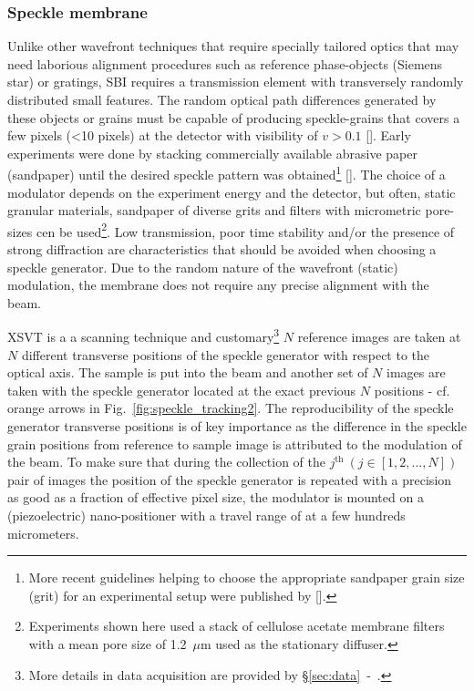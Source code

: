 \begin{refsection}
\subsubsection*{Speckle membrane}

Unlike other wavefront techniques that require specially tailored optics that may need laborious alignment procedures such as reference phase-objects (Siemens star) or gratings, SBI requires a transmission element with transversely randomly distributed small features. The random optical path differences generated by these objects or grains must be capable of producing speckle-grains that covers a few pixels (<10 pixels) at the detector with visibility of $ v>0.1$ [\cite[\textit{\S2.3}]{Berujon2020a}]. Early experiments were done by stacking commercially available abrasive paper (sandpaper) until the desired speckle pattern was obtained\footnote{More recent guidelines helping to choose the appropriate sandpaper grain size (grit) for an experimental setup were published by [\cite{Tian2020}].} [\cite{Morgan2012, Wang2016}]. The choice of a modulator depends on the experiment energy and the detector, but often, static granular materials, sandpaper of diverse grits and filters with micrometric pore-sizes cen be used\footnote{Experiments shown here used a stack of cellulose acetate membrane filters with a mean pore size of 1.2~$\mu$m used as the stationary diffuser.}. Low transmission, poor time stability and/or the presence of strong diffraction are characteristics that should be avoided when choosing a speckle generator. Due to the random nature of the wavefront (static) modulation, the membrane does not require any precise alignment with  the beam. 

XSVT is a a scanning technique and customary\footnote{More details in data acquisition are provided by \S\ref{sec:data}~-~\textit{}.} $N$ reference images are taken at $N$ different transverse positions of the speckle generator with respect to the optical axis. The sample is put into the beam and another set of $N$ images are taken with the speckle generator located at the exact previous $N$ positions - cf. orange arrows in Fig.~\ref{fig:speckle_tracking2}. The reproducibility of the speckle generator transverse positions is of key importance as the difference in the speckle grain positions from reference to sample image is attributed to the modulation of the beam. To make sure that during the collection of the $j^\text{th}~(j\in[1,2,...,N])$ pair of images the position of the speckle generator is repeated with a precision as good as a fraction of effective pixel size, the modulator is mounted on a (piezoelectric) nano-positioner with a travel range of at a few hundreds micrometers.


\end{refsection}
